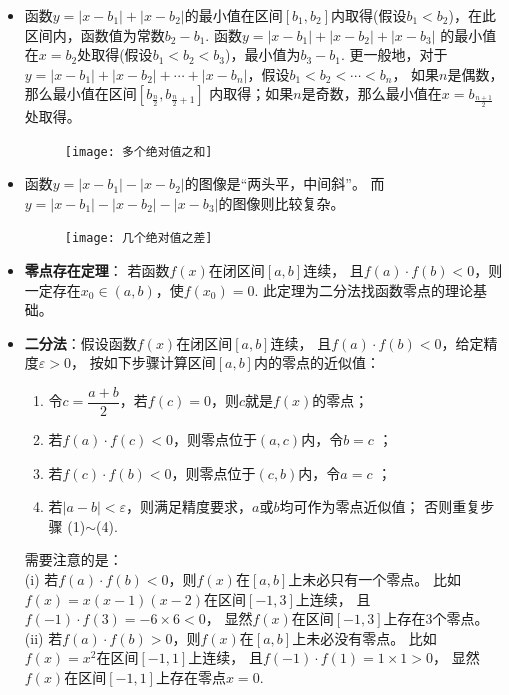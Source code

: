 \begin{itemize}[leftmargin=\inteval{\myitemleftmargin}pt,itemsep=
   \inteval{\myitemitempsep}pt,topsep=\inteval{\myitemtopsep}pt]
\item 函数$ y=|x-b_1|+|x-b_2| $的最小值在区间$ [b_1,b_2] $内取得(假设$ b_1<
b_2 $)，在此区间内，函数值为常数$ b_2-b_1 $. 函数$ y=|x-b_1|+|x-b_2|+|x-b_3| $
的最小值在$ x=b_2 $处取得(假设$ b_1<b_2<b_3 $)，最小值为$ b_3-b_1 $. 
更一般地，对于$ y=|x-b_1|+|x-b_2|+\cdots+|x-b_n| $，假设$ b_1<b_2<\cdots<b_n $，
如果$ n $是偶数，那么最小值在区间$ [b_{\frac{n}{2}},b_{\frac{n}{2}+1}] $
内取得；如果$ n $是奇数，那么最小值在$ x=b_{\frac{n+1}{2}} $处取得。

\begin{figure}[H]
    \centering
    \texttt{[image: 多个绝对值之和]}
\end{figure} 

\item 函数$ y=|x-b_1|-|x-b_2| $的图像是“两头平，中间斜”。
而$ y=|x-b_1|-|x-b_2|-|x-b_3| $的图像则比较复杂。
\begin{figure}[H]
    \centering
    \texttt{[image: 几个绝对值之差]}
\end{figure}

\item \textbf{零点存在定理}： 若函数$ f(x) $在闭区间$ [a,b] $连续，
且$ f(a)\cdot f(b)<0 $，则一定存在$ x_0\in(a,b) $，使$ f(x_0)=0 $. 
此定理为二分法找函数零点的理论基础。

\item \textbf{二分法}：假设函数$ f(x) $在闭区间$ [a,b] $连续，
且$ f(a)\cdot f(b)<0 $，给定精度$\varepsilon >0$，
按如下步骤计算区间$[a,b]$内的零点的近似值：
\begin{enumerate}[label=(\arabic*)]
    \item 令$c=\dfrac{a+b}{2}$，若$f(c)=0$，则$c$就是$f(x)$的零点；
    \item 若$ f(a)\cdot f(c)<0 $，则零点位于$(a,c)$内，令$b=c$ ；
    \item 若$ f(c)\cdot f(b)<0 $，则零点位于$(c,b)$内，令$a=c$ ；
    \item 若$ |a-b|<\varepsilon $，则满足精度要求，$a$或$b$均可作为零点近似值；
    否则重复步骤 (1)$\sim$(4).
\end{enumerate}
需要注意的是：\\
(i) 若$ f(a)\cdot f(b)<0 $，则$f(x)$在$[a,b]$上未必只有一个零点。
比如$f(x)=x(x-1)(x-2)$在区间$[-1,3]$上连续，
且$ f(-1)\cdot f(3)=-6\times 6 <0 $，
显然$ f(x) $在区间$[-1,3]$上存在3个零点。 \\
(ii) 若$ f(a)\cdot f(b)>0 $，则$f(x)$在$[a,b]$上未必没有零点。
比如$f(x)=x^2$在区间$[-1,1]$上连续，
且$ f(-1)\cdot f(1)=1\times 1 >0 $，
显然$ f(x) $在区间$[-1,1]$上存在零点$x=0$. 


\end{itemize}
